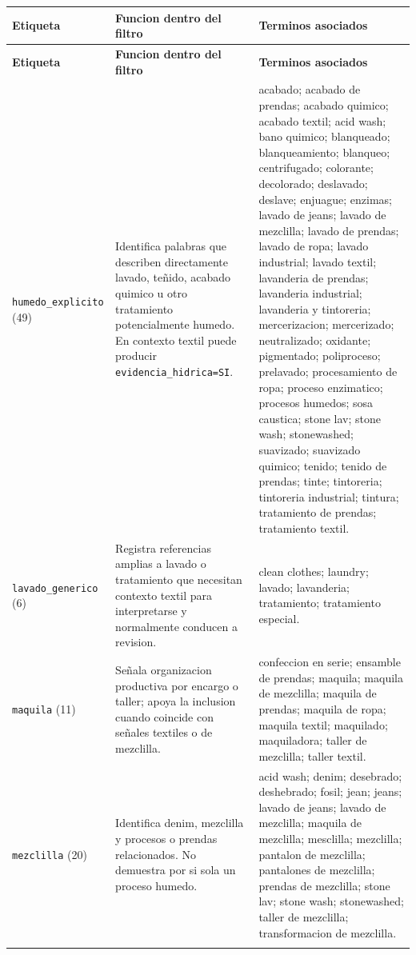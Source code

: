\documentclass[11pt,letterpaper]{article}
\begin{document}
\footnotesize
\setlength{\tabcolsep}{4pt}
\begin{longtable}{>{\raggedright\arraybackslash}p{}>{\raggedright\arraybackslash}p{}>{\raggedright\arraybackslash}p{}}
\toprule
\textbf{Etiqueta} & \textbf{Funcion dentro del filtro} & \textbf{Terminos asociados} \\
\midrule
\endfirsthead
\toprule
\textbf{Etiqueta} & \textbf{Funcion dentro del filtro} & \textbf{Terminos asociados} \\
\midrule
\endhead
\bottomrule
\endfoot

\texttt{humedo\_explicito} (49) & Identifica palabras que describen directamente lavado, teñido, acabado quimico u otro tratamiento potencialmente humedo. En contexto textil puede producir \texttt{evidencia\_hidrica=SI}. & acabado; acabado de prendas; acabado quimico; acabado textil; acid wash; bano quimico; blanqueado; blanqueamiento; blanqueo; centrifugado; colorante; decolorado; deslavado; deslave; enjuague; enzimas; lavado de jeans; lavado de mezclilla; lavado de prendas; lavado de ropa; lavado industrial; lavado textil; lavanderia de prendas; lavanderia industrial; lavanderia y tintoreria; mercerizacion; mercerizado; neutralizado; oxidante; pigmentado; poliproceso; prelavado; procesamiento de ropa; proceso enzimatico; procesos humedos; sosa caustica; stone lav; stone wash; stonewashed; suavizado; suavizado quimico; tenido; tenido de prendas; tinte; tintoreria; tintoreria industrial; tintura; tratamiento de prendas; tratamiento textil. \\
\addlinespace

\texttt{lavado\_generico} (6) & Registra referencias amplias a lavado o tratamiento que necesitan contexto textil para interpretarse y normalmente conducen a revision. & clean clothes; laundry; lavado; lavanderia; tratamiento; tratamiento especial. \\
\addlinespace

\texttt{maquila} (11) & Señala organizacion productiva por encargo o taller; apoya la inclusion cuando coincide con señales textiles o de mezclilla. & confeccion en serie; ensamble de prendas; maquila; maquila de mezclilla; maquila de prendas; maquila de ropa; maquila textil; maquilado; maquiladora; taller de mezclilla; taller textil. \\
\addlinespace

\texttt{mezclilla} (20) & Identifica denim, mezclilla y procesos o prendas relacionados. No demuestra por si sola un proceso humedo. & acid wash; denim; desebrado; deshebrado; fosil; jean; jeans; lavado de jeans; lavado de mezclilla; maquila de mezclilla; mesclilla; mezclilla; pantalon de mezclilla; pantalones de mezclilla; prendas de mezclilla; stone lav; stone wash; stonewashed; taller de mezclilla; transformacion de mezclilla. \\
\addlinespace


\end{longtable}
\end{document}
